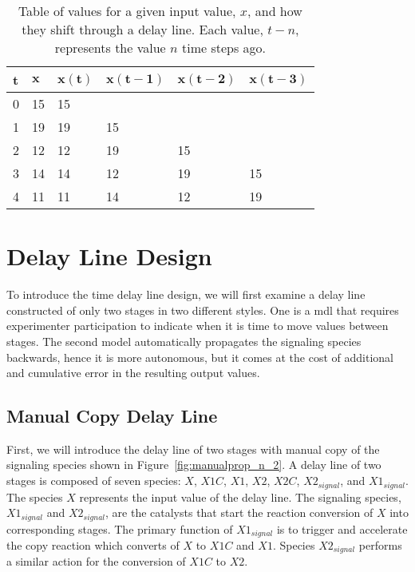 \begin{table}
    \centering
    \begin{tabular}{l|l|l l l l}
    \textbf{t} & $\mathbf{x}$ & $\mathbf{x(t)}$ & $\mathbf{x(t-1)}$ & $\mathbf{x(t-2)}$ & $\mathbf{x(t-3)}$ \\ \hline
    0 & 15 & 15 & ~  & ~  & ~  \\
    1 & 19 & 19 & 15 & ~  & ~  \\
    2 & 12 & 12 & 19 & 15 & ~  \\
    3 & 14 & 14 & 12 & 19 & 15 \\
    4 & 11 & 11 & 14 & 12 & 19 \\
    \end{tabular}
    \caption[Delay Line Values Over Time]{Table of values for a given input value, $x$, and how they shift through a delay line. Each value, $t-n$, represents the value $n$ time steps ago.}
    \label{tab:delay_line_general}
\end{table}

\section{Delay Line Design}
\label{sec:delayline}
To introduce the time delay line design, we will first examine a delay line constructed of only two stages in two different styles. One is a \acrfull{mdl} that requires experimenter participation to indicate when it is time to move values between stages. The second model automatically propagates the signaling species backwards, hence it is more autonomous, but it comes at the cost of additional and cumulative error in the resulting output values.

\subsection{Manual Copy Delay Line}
First, we will introduce the delay line of two stages with manual copy of the signaling species shown in Figure~\ref{fig:manualprop_n_2}. A delay line of two stages is composed of seven species: $X$, $X1C$, $X1$, $X2$, $X2C$, $X2_{signal}$, and $X1_{signal}$. The species $X$ represents the input value of the delay line. The signaling species, $X1_{signal}$ and $X2_{signal}$, are the catalysts that start the reaction conversion of $X$ into corresponding stages. The primary function of $X1_{signal}$ is to trigger and accelerate the copy reaction which converts of $X$ to $X1C$ and $X1$. Species $X2_{signal}$ performs a similar action for the conversion of $X1C$ to $X2$.

